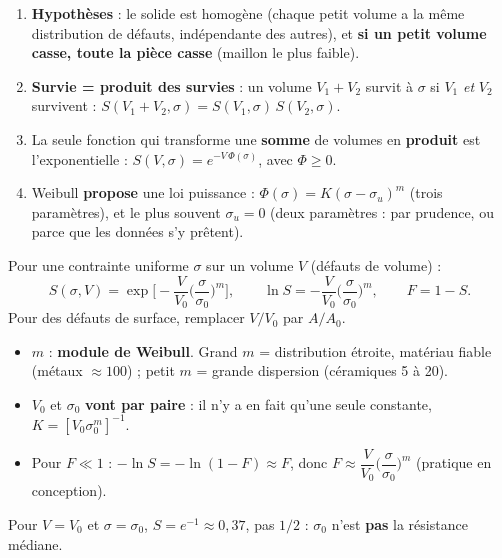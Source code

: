 \begin{enumerate}
  \item \textbf{Hypothèses} : le solide est homogène (chaque petit volume a la même
        distribution de défauts, indépendante des autres), et \textbf{si un petit volume casse,
        toute la pièce casse} (maillon le plus faible).
  \item \textbf{Survie = produit des survies} : un volume $V_1 + V_2$ survit à $\sigma$ si $V_1$
        \emph{et} $V_2$ survivent : $S(V_1+V_2,\sigma) = S(V_1,\sigma)\,S(V_2,\sigma)$.
  \item La seule fonction qui transforme une \textbf{somme} de volumes en \textbf{produit} est
        l'exponentielle : $S(V,\sigma) = e^{-V\,\Phi(\sigma)}$, avec $\Phi \ge 0$.
  \item Weibull \textbf{propose} une loi puissance : $\Phi(\sigma) = K(\sigma - \sigma_u)^m$
        (trois paramètres), et le plus souvent $\sigma_u = 0$ (deux paramètres : par prudence,
        ou parce que les données s'y prêtent).
\end{enumerate}

\begin{thmbox}[title={Statistique de Weibull (à connaître par c\oe ur)}]
Pour une contrainte uniforme $\sigma$ sur un volume $V$ (défauts de volume) :
\[ S(\sigma,V) = \exp\!\Big[-\frac{V}{V_0}\Big(\frac{\sigma}{\sigma_0}\Big)^m\Big],
   \qquad
   \ln S = -\frac{V}{V_0}\Big(\frac{\sigma}{\sigma_0}\Big)^m,
   \qquad F = 1 - S . \]
Pour des défauts de surface, remplacer $V/V_0$ par $A/A_0$.
\begin{itemize}
  \item $m$ : \textbf{module de Weibull}. Grand $m$ = distribution étroite, matériau fiable
        (métaux $\approx 100$) ; petit $m$ = grande dispersion (céramiques 5 à 20).
  \item $V_0$ et $\sigma_0$ \textbf{vont par paire} : il n'y a en fait qu'une seule constante,
        $K = [V_0\sigma_0^m]^{-1}$.
  \item Pour $F \ll 1$ : $-\ln S = -\ln(1-F) \approx F$, donc
        $F \approx \dfrac{V}{V_0}\Big(\dfrac{\sigma}{\sigma_0}\Big)^m$ (pratique en conception).
\end{itemize}
\end{thmbox}


\begin{warnbox}[title={$\sigma = \sigma_0$ n'est pas la médiane}]
Pour $V = V_0$ et $\sigma = \sigma_0$, $S = e^{-1} \approx 0{,}37$, pas $1/2$ : $\sigma_0$ n'est
\textbf{pas} la résistance médiane.
\end{warnbox}

